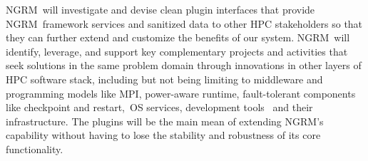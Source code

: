 \documentclass{article}
\newcommand{\ngrm}{NGRM}
\begin{document}
\ngrm\ will investigate and devise clean plugin interfaces that
provide \ngrm\ framework services and sanitized data to other HPC
stakeholders so that they can further extend and customize the benefits
of our system. \ngrm\ will identify, leverage, and support key complementary
projects and activities that seek solutions in the same problem domain
through innovations in other layers of HPC software stack, including but
not being limiting to middleware and programming models like MPI,
power-aware runtime, fault-tolerant components like checkpoint and
restart, OS services, development tools  and their infrastructure.
The plugins will be the main mean of extending \ngrm’s capability
without having to lose the stability and robustness of its core
functionality.











\appendix




\end{document}

